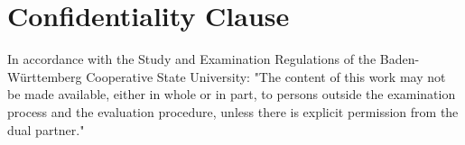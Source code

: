 
\thispagestyle{empty}
\section*{Confidentiality Clause}

\vspace*{2em}

In accordance with the Study and Examination Regulations of the Baden-Württemberg Cooperative State University:
"The content of this work may not be made available, either in whole or in part, to persons outside the examination process and the evaluation procedure, unless there is explicit permission from the dual partner."